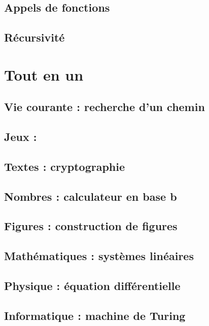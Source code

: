 \documentclass[11pt,a4paper,colorlinks,breaklinks]{book}
\begin{document}
\chapter{Appels de fonctions}\label{fonctions:appels}
%	
%
\chapter{Récursivité}\label{fonctions:recursivite}
%	
%
%
\part{Tout en un}\label{tout-en-un}
%
\chapter{Vie courante : recherche d'un chemin}\label{tout-en-un:vie-courante}
%
\chapter{Jeux : }\label{tout-en-un:jeux}
%
\chapter{Textes : cryptographie}\label{tout-en-un:textes}
%
\chapter{Nombres : calculateur en base b}\label{tout-en-un:nombres}
%
\chapter{Figures : construction de figures}\label{tout-en-un:figures}
%
\chapter{Mathématiques : systèmes linéaires}\label{tout-en-un:maths}
%
\chapter{Physique : équation différentielle}\label{tout-en-un:physique}
%
\chapter{Informatique : machine de Turing}\label{tout-en-un:informatique}
%



\end{document}
